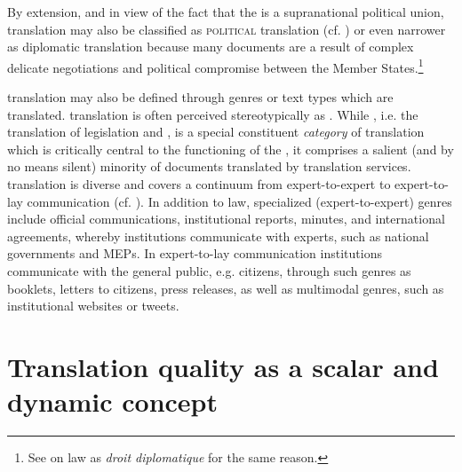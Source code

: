 \documentclass[output=paper]{langsci/langscibook}
\begin{document}
By extension, and in view of the fact that the  is a supranational political union,  translation may also be classified as \textsc{political} translation (cf. \citealt[147]{Trosborg1997}) or even narrower as diplomatic translation because many  documents are a result of complex delicate negotiations and political compromise between the Member States.\footnote{See \citet[44]{Šarčević2007} on  law as \textit{droit diplomatique} for the same reason.}

 translation may also be defined through genres or text types which are translated.  translation is often perceived stereotypically as . While , i.e. the translation of  legislation and , is a special constituent \textit{category} of  translation which is critically central to the functioning of the , it comprises a salient (and by no means silent) minority of documents translated by  translation services.  translation is diverse and covers a continuum from expert-to-expert to expert-to-lay communication (cf. \citealt[56]{Biel2014}). In addition to law, specialized (expert-to-expert) genres include official communications, institutional reports, minutes, and international agreements, whereby institutions communicate with experts, such as national governments and MEPs. In expert-to-lay communication institutions communicate with the general public, e.g. citizens, through such genres as booklets, letters to citizens, press releases, as well as multimodal genres, such as institutional websites or tweets. 

\section{Translation quality as a scalar and dynamic concept}\label{sec:biel:2}
\end{document}
